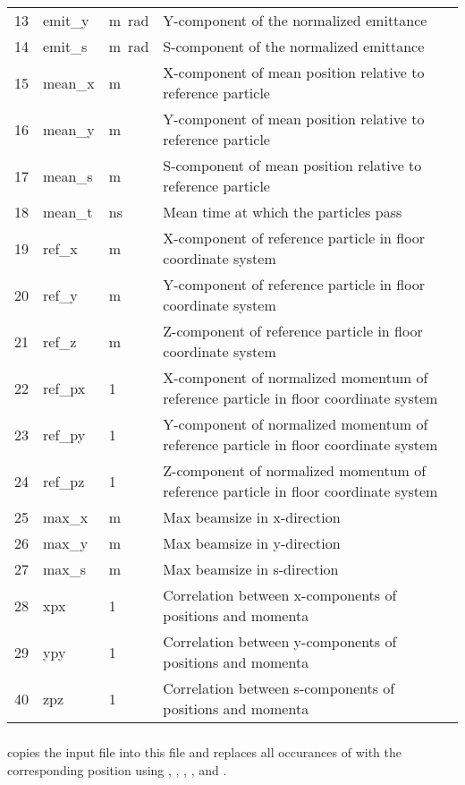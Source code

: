 \begin{center}
\begin{longtable}{p{1.2cm}p{1.9cm}p{1.3cm}p{9.5cm}}
13 & emit\_y & \si{\meter\radian} & Y-component of the normalized emittance\\
14 & emit\_s & \si{\meter\radian} & S-component of the normalized emittance\\
15 & mean\_x & \si{\meter} & X-component of mean position relative to reference particle\\
16 & mean\_y & \si{\meter} & Y-component of mean position relative to reference particle\\
17 & mean\_s & \si{\meter} & S-component of mean position relative to reference particle\\
18 & mean\_t & \si{\nano\second} & Mean time at which the particles pass\\
19 & ref\_x & \si{\meter} & X-component of reference particle in floor coordinate system\\
20 & ref\_y & \si{\meter} & Y-component of reference particle in floor coordinate system\\
21 & ref\_z & \si{\meter} & Z-component of reference particle in floor coordinate system\\
22 & ref\_px & 1 & X-component of normalized momentum of reference particle in floor coordinate system\\
23 & ref\_py & 1 & Y-component of normalized momentum of reference particle in floor coordinate system\\
24 & ref\_pz & 1 & Z-component of normalized momentum of reference particle in floor coordinate system\\
25 & max\_x & \si{\meter} & Max beamsize in x-direction\\
26 & max\_y & \si{\meter} & Max beamsize in y-direction\\
27 & max\_s & \si{\meter} & Max beamsize in s-direction\\
28 & xpx & 1 & Correlation between x-components of positions and momenta\\
29 & ypy & 1 & Correlation between y-components of positions and momenta\\
40 & zpz & 1 & Correlation between s-components of positions and momenta\\
\end{longtable}
\end{center}

\subsubsection*{}
\opalt copies the input file into this file and replaces all occurances of  with the corresponding position using , , , ,  and .

